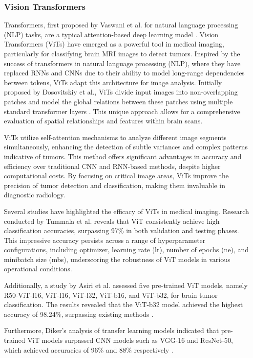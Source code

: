 \subsubsection{Vision Transformers}

Transformers, first proposed by Vaswani et al. for natural language processing (NLP) tasks, are a typical attention-based deep learning model \cite{NIPS2017_3f5ee243}. Vision Transformers (ViTs) have emerged as a powerful tool in medical imaging, particularly for classifying brain MRI images to detect tumors. Inspired by the success of transformers in natural language processing (NLP), where they have replaced RNNs and CNNs due to their ability to model long-range dependencies between tokens, ViTs adapt this architecture for image analysis. Initially proposed by Dosovitskiy et al., ViTs divide input images into non-overlapping patches and model the global relations between these patches using multiple standard transformer layers \cite{dosovitskiy2021image}. This unique approach allows for a comprehensive evaluation of spatial relationships and features within brain scans.

ViTs utilize self-attention mechanisms to analyze different image segments simultaneously, enhancing the detection of subtle variances and complex patterns indicative of tumors. This method offers significant advantages in accuracy and efficiency over traditional CNN and RNN-based methods, despite higher computational costs. By focusing on critical image areas, ViTs improve the precision of tumor detection and classification, making them invaluable in diagnostic radiology.

Several studies have highlighted the efficacy of ViTs in medical imaging. Research conducted by Tummala et al. \cite{Tummala2022} reveals that ViT consistently achieve high classification accuracies, surpassing 97\% in both validation and testing phases. This impressive accuracy persists across a range of hyperparameter configurations, including optimizer, learning rate (lr), number of epochs (ne), and minibatch size (mbs), underscoring the robustness of ViT models in various operational conditions.

Additionally, a study by Asiri et al. assessed five pre-trained ViT models, namely R50-ViT-l16, ViT-l16, ViT-l32, ViT-b16, and ViT-b32, for brain tumor classification. The results revealed that the ViT-b32 model achieved the highest accuracy of 98.24\%, surpassing existing methods \cite{Asiri2023Advancing}. 

Furthermore, Diker's analysis of transfer learning models indicated that pre-trained ViT models surpassed CNN models such as VGG-16 and ResNet-50, which achieved accuracies of 96\% and 88\% respectively \cite{Diker2021A}.

